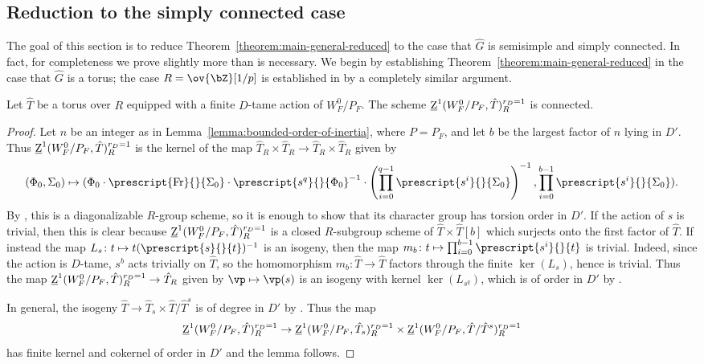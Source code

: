 \subsection{Reduction to the simply connected case}\label{ss:sc}

The goal of this section is to reduce Theorem~\ref{theorem:main-general-reduced} to the case that $\hat{G}$ is semisimple and simply connected. In fact, for completeness we prove slightly more than is necessary. We begin by establishing Theorem~\ref{theorem:main-general-reduced} in the case that $\hat{G}$ is a torus; the case $R = \ov{\bZ}[1/p]$ is established in \cite[3.14]{Dat-notes} by a completely similar argument.

\begin{lemma}\label{lemma:torus-case}
    Let $\hat{T}$ be a torus over $R$ equipped with a finite $D$-tame action of $W_F^0/P_F$. The scheme $\underline{\rm{Z}}^1(W_F^0/P_F, \hat{T})^{r_D = 1}_R$ is connected.
\end{lemma}

\begin{proof}
    Let $n$ be an integer as in Lemma~\ref{lemma:bounded-order-of-inertia}, where $P = P_F$, and let $b$ be the largest factor of $n$ lying in $D'$. Thus $\underline{\rm{Z}}^1(W_F^0/P_F, \hat{T})^{r_D = 1}_R$ is the kernel of the map $\hat{T}_R \times \hat{T}_R \to \hat{T}_R \times \hat{T}_R$ given by
    \[
    (\Phi_0, \Sigma_0) \mapsto (\Phi_0 \cdot \prescript{\rm{Fr}}{}{\Sigma_0} \cdot \prescript{s^q}{}{\Phi_0}^{-1} \cdot \left(\prod_{i=0}^{q-1} \prescript{s^i}{}{\Sigma_0}\right)^{-1}, \prod_{i=0}^{b-1} \prescript{s^i}{}{\Sigma_0}).
    \]
    By \cite[IX, 6.8]{SGA3II}, this is a diagonalizable $R$-group scheme, so it is enough to show that its character group has torsion order in $D'$. If the action of $s$ is trivial, then this is clear because $\underline{\rm{Z}}^1(W_F^0/P_F, \hat{T})^{r_D = 1}_R$ is a closed $R$-subgroup scheme of $\hat{T} \times \hat{T}[b]$ which surjects onto the first factor of $\hat{T}$. If instead the map $L_s\colon t \mapsto t (\prescript{s}{}{t})^{-1}$ is an isogeny, then the map $m_b\colon t \mapsto \prod_{i=0}^{b-1} \prescript{s^i}{}{t}$ is trivial. Indeed, since the action is $D$-tame, $s^b$ acts trivially on $\hat{T}$, so the homomorphism $m_b\colon \hat{T} \to \hat{T}$ factors through the finite $\ker(L_s)$, hence is trivial. Thus the map $\underline{\rm{Z}}^1(W_F^0/P_F, \hat{T})^{r_D = 1}_R \to \hat{T}_R$ given by $\vp \mapsto \vp(s)$ is an isogeny with kernel $\ker(L_{s^q})$, which is of order in $D'$ by \cite[1.2(1)]{Digne-Michel-quass}.\smallskip

    In general, the isogeny $\hat{T} \to \hat{T}_s \times \hat{T}/\hat{T}^s$ is of degree in $D'$ by \cite[1.2(3)]{Digne-Michel-quass}. Thus the map
    \[
    \underline{\rm{Z}}^1(W_F^0/P_F, \hat{T})^{r_D = 1}_R \to \underline{\rm{Z}}^1(W_F^0/P_F, \hat{T}_s)^{r_D = 1}_R \times \underline{\rm{Z}}^1(W_F^0/P_F, \hat{T}/\hat{T}^s)^{r_D = 1}_R
    \]
    has finite kernel and cokernel of order in $D'$ and the lemma follows.
\end{proof}

